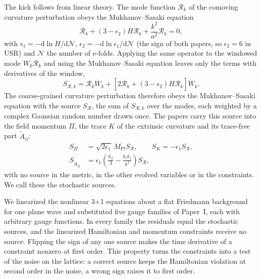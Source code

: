 \documentclass[aps,prd,twocolumn,10pt,superscriptaddress,nofootinbib,longbibliography,floatfix]{revtex4-2}
\newcommand{\dd}{\mathrm{d}}
\newcommand{\Mpl}{M_\mathrm{Pl}}
\newcommand{\Pone}{Paper~I}
\begin{document}
The kick follows from linear theory. The mode function $\mathcal{R}_k$ of the comoving curvature perturbation obeys the Mukhanov--Sasaki equation \cite{Sasaki:1986,Mukhanov:1988}
\begin{equation}
\ddot{\mathcal{R}}_k + (3-\epsilon_2) H \dot{\mathcal{R}}_k + \frac{k^2}{a^2} \mathcal{R}_k = 0,
\label{eq:ms}
\end{equation}
with $\epsilon_1 = -\dd\ln H/\dd\mathcal{N}$, $\epsilon_2 = -\dd\ln\epsilon_1/\dd\mathcal{N}$ (the sign of both papers, so $\epsilon_2 = 6$ in USR) and $\mathcal{N}$ the number of e-folds. Applying the same operator to the windowed mode $W_k \mathcal{R}_k$ and using the Mukhanov--Sasaki equation leaves only the terms with derivatives of the window,
\begin{equation}
S_{\mathcal{R},k} = \mathcal{R}_k \ddot W_k + \left[2\dot{\mathcal{R}}_k + (3-\epsilon_2) H \mathcal{R}_k\right] \dot W_k .
\label{eq:sr}
\end{equation}
The coarse-grained curvature perturbation therefore obeys the Mukhanov--Sasaki equation with the source $S_\mathcal{R}$, the sum of $S_{\mathcal{R},k}$ over the modes, each weighted by a complex Gaussian random number drawn once. The papers carry this source into the field momentum $\Pi$, the trace $K$ of the extrinsic curvature and its trace-free part $\tilde A_{ij}$:
\begin{equation}
\begin{aligned}
S_\Pi &= \sqrt{2\epsilon_1}\,\Mpl S_\mathcal{R}, \qquad S_K = -\epsilon_1 S_\mathcal{R}, \\
S_{\tilde A_{ij}} &= \epsilon_1\left(\frac{\delta_{ij}}{3} - \frac{k_i k_j}{k^2}\right) S_\mathcal{R},
\end{aligned}
\label{eq:sources}
\end{equation}
with no source in the metric, in the other evolved variables or in the constraints. We call these the stochastic sources.

We linearized the nonlinear 3+1 equations about a flat Friedmann background for one plane wave and substituted five gauge families of \Pone{}, each with arbitrary gauge functions. In every family the residuals equal the stochastic sources, and the linearized Hamiltonian and momentum constraints receive no source. Flipping the sign of any one source makes the time derivative of a constraint nonzero at first order. This property turns the constraints into a test of the noise on the lattice: a correct source keeps the Hamiltonian violation at second order in the noise, a wrong sign raises it to first order.
\end{document}
